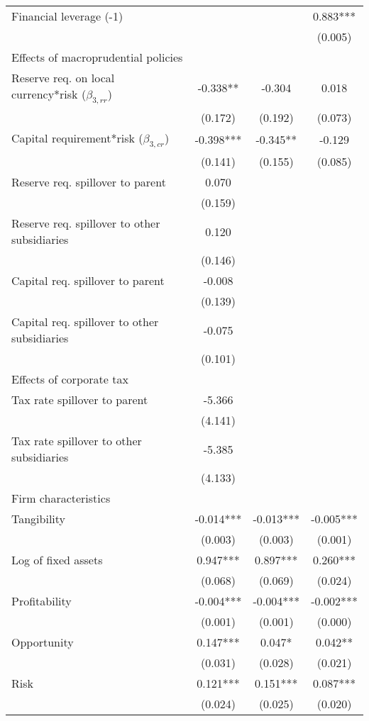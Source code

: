 \begin{longtable}{lccc}
\quad Financial leverage (-1) &  &  & 0.883*** \\
 &  &  & (0.005) \\
  Effects of macroprudential policies  &  &  &  \\
\quad Reserve req. on local currency*risk ($\beta_{3,rr}$) & -0.338** & -0.304 & 0.018 \\
 & (0.172) & (0.192) & (0.073) \\
\quad Capital requirement*risk ($\beta_{3,cr}$) & -0.398*** & -0.345** & -0.129 \\
 & (0.141) & (0.155) & (0.085) \\
\quad Reserve req.  spillover to parent & 0.070 &  &  \\
 & (0.159) &  &  \\
\quad Reserve req.  spillover to other subsidiaries & 0.120 &  &  \\
 & (0.146) &  &  \\
\quad Capital req. spillover to parent & -0.008 &  &  \\
 & (0.139) &  &  \\
\quad Capital req. spillover to other subsidiaries & -0.075 &  &  \\
 & (0.101) &  &  \\
   Effects of corporate tax &  &  &  \\
\quad Tax rate spillover to parent & -5.366 &  &  \\
 & (4.141) &  &  \\
\quad Tax rate spillover to other subsidiaries & -5.385 &  &  \\
 & (4.133) &  &  \\
    Firm characteristics &  &  &  \\
\quad Tangibility & -0.014*** & -0.013*** & -0.005*** \\
 & (0.003) & (0.003) & (0.001) \\
\quad Log of fixed assets & 0.947*** & 0.897*** & 0.260*** \\
 & (0.068) & (0.069) & (0.024) \\
\quad Profitability & -0.004*** & -0.004*** & -0.002*** \\
 & (0.001) & (0.001) & (0.000) \\
\quad Opportunity & 0.147*** & 0.047* & 0.042** \\
 & (0.031) & (0.028) & (0.021) \\
\quad Risk & 0.121*** & 0.151*** & 0.087*** \\
 & (0.024) & (0.025) & (0.020) \\

\end{longtable}
